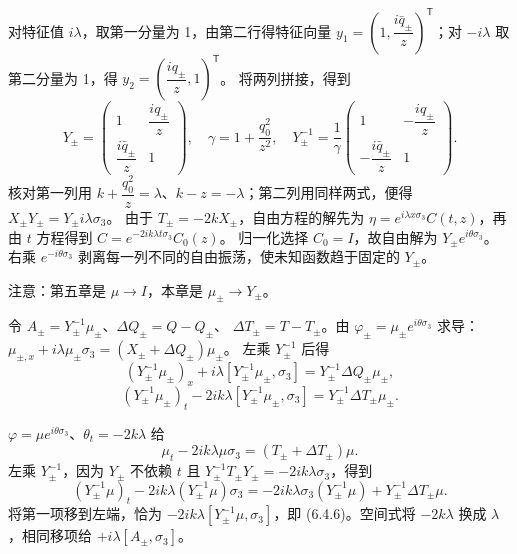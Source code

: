 \documentclass[lang=cn,scheme=chinese,mode=simple,device=normal,color=blue,
math=cm,thmcnt=section,12pt]{elegantbook}
\newcommand{\eqq}[2]{\tag{#1}\label{eq:#1}#2}
\begin{document}
\begin{callout}
    对特征值 $i\lambda$，取第一分量为 1，由第二行得特征向量
    $y_1=(1,\dfrac{i\bar q_\pm}{z})^{\mathsf T}$；对 $-i\lambda$ 取第二分量为 1，得
    $y_2=(\dfrac{iq_\pm}{z},1)^{\mathsf T}$。
    将两列拼接，得到
    \[
        Y_\pm=\begin{pmatrix}1&\dfrac{iq_\pm}{z}\\\dfrac{i\bar q_\pm}{z}&1\end{pmatrix},\quad
        \gamma=1+\dfrac{q_0^2}{z^2},\quad
        Y_\pm^{-1}=\dfrac{1}{\gamma}
        \begin{pmatrix}1&-\dfrac{iq_\pm}{z}\\-\dfrac{i\bar q_\pm}{z}&1\end{pmatrix}.
    \]
    核对第一列用 $k+\dfrac{q_0^2}{z}=\lambda$、$k-z=-\lambda$；第二列用同样两式，便得
    $X_\pm Y_\pm=Y_\pm i\lambda\sigma_3$。
    由于 $T_\pm=-2kX_\pm$，自由方程的解先为
    $\eta=e^{i\lambda x\sigma_3}C(t,z)$，再由 $t$ 方程得到
    $C=e^{-2ik\lambda t\sigma_3}C_0(z)$。
    归一化选择 $C_0=I$，故自由解为 $Y_\pm e^{i\theta\sigma_3}$。
    右乘 $e^{-i\theta\sigma_3}$ 剥离每一列不同的自由振荡，使未知函数趋于固定的 $Y_\pm$。
\end{callout}




注意：第五章是 $\mu\to I$，本章是 $\mu_\pm\to Y_\pm$。

令 $A_\pm=Y_\pm^{-1}\mu_\pm$、$\Delta Q_\pm=Q-Q_\pm$、
$\Delta T_\pm=T-T_\pm$。由 $\varphi_\pm=\mu_\pm e^{i\theta\sigma_3}$ 求导：
$\mu_{\pm,x}+i\lambda\mu_\pm\sigma_3=(X_\pm+\Delta Q_\pm)\mu_\pm$。
左乘 $Y_\pm^{-1}$ 后得
\begin{equation}\eqq{6.4.5}{(Y_\pm^{-1}\mu_\pm)_x+i\lambda[Y_\pm^{-1}\mu_\pm,\sigma_3]=Y_\pm^{-1}\Delta Q_\pm\mu_\pm,}\end{equation}
\begin{equation}\eqq{6.4.6}{(Y_\pm^{-1}\mu_\pm)_t-2ik\lambda[Y_\pm^{-1}\mu_\pm,\sigma_3]=Y_\pm^{-1}\Delta T_\pm\mu_\pm.}\end{equation}

\begin{callout}[计算：时间交换子方程中的求导与移项]
    $\varphi=\mu e^{i\theta\sigma_3}$、$\theta_t=-2k\lambda$ 给
    \[
        \mu_t-2ik\lambda\mu\sigma_3=(T_\pm+\Delta T_\pm)\mu.
    \]
    左乘 $Y_\pm^{-1}$，因为 $Y_\pm$ 不依赖 $t$ 且 $Y_\pm^{-1}T_\pm Y_\pm=-2ik\lambda\sigma_3$，得到
    \[
        (Y_\pm^{-1}\mu)_t-2ik\lambda(Y_\pm^{-1}\mu)\sigma_3
        =-2ik\lambda\sigma_3(Y_\pm^{-1}\mu)+Y_\pm^{-1}\Delta T_\pm\mu.
    \]
    将第一项移到左端，恰为 $-2ik\lambda[Y_\pm^{-1}\mu,\sigma_3]$，即 (6.4.6)。空间式将 $-2k\lambda$ 换成 $\lambda$，相同移项给 $+i\lambda[A_\pm,\sigma_3]$。
\end{callout}
\end{document}
